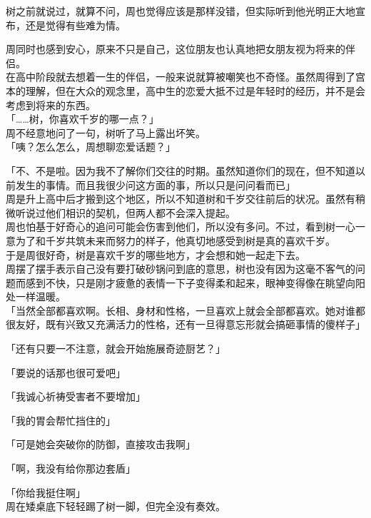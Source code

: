 树之前就说过，就算不问，周也觉得应该是那样没错，但实际听到他光明正大地宣布，还是觉得有些难为情。

周同时也感到安心，原来不只是自己，这位朋友也认真地把女朋友视为将来的伴侣。\\

在高中阶段就去想着一生的伴侣，一般来说就算被嘲笑也不奇怪。虽然周得到了宫本的理解，但在大众的观念里，高中生的恋爱大抵不过是年轻时的经历，并不是会考虑到将来的东西。\\

「……树，你喜欢千岁的哪一点？」\\

周不经意地问了一句，树听了马上露出坏笑。\\

「咦？怎么怎么，周想聊恋爱话题？」

「不、不是啦。因为我不了解你们交往的时期。虽然知道你们的现在，但不知道以前发生的事情。而且我很少问这方面的事，所以只是问问看而已」\\

周是升上高中后才搬到这个地区，所以不知道树和千岁交往前后的状况。虽然有稍微听说过他们相识的契机，但两人都不会深入提起。\\

周也怕基于好奇心的追问可能会伤害到他们，所以没有多问。不过，看到树一心一意为了和千岁共筑未来而努力的样子，他真切地感受到树是真的喜欢千岁。\\

于是周很好奇，树是喜欢千岁的哪些地方，才会想和她一起走下去。\\

周摆了摆手表示自己没有要打破砂锅问到底的意思，树也没有因为这毫不客气的问题而感到不快，只是刚才疲惫的表情一下子变得柔和起来，眼神变得像在眺望向阳处一样温暖。\\

「当然全部都喜欢啊。长相、身材和性格，一旦喜欢上就会全部都喜欢。她对谁都很友好，既有兴致又充满活力的性格，还有一旦得意忘形就会搞砸事情的傻样子」

「还有只要一不注意，就会开始施展奇迹厨艺？」

「要说的话那也很可爱吧」

「我诚心祈祷受害者不要增加」

「我的胃会帮忙挡住的」

「可是她会突破你的防御，直接攻击我啊」

「啊，我没有给你那边套盾」

「你给我挺住啊」\\

周在矮桌底下轻轻踢了树一脚，但完全没有奏效。\\

